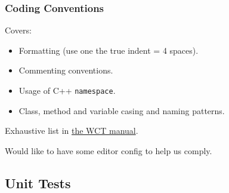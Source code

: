 \documentclass[xcolor=dvipsnames]{beamer}
\begin{document}
\begin{frame}
  \tableofcontents[
  currentsection,
  currentsubsection,        
  subsectionstyle=show/shaded/hide]
\end{frame}

\begin{frame}
  \frametitle{Coding Conventions}
  Covers:
  \begin{itemize}
  \item Formatting (use one the true indent = 4 spaces).
  \item Commenting conventions.
  \item Usage of C++ \texttt{namespace}.
  \item Class, method and variable casing and naming patterns.
  \end{itemize}
  Exhaustive list in \href{https://wirecell.github.io/}{the WCT manual}.

  \vfill
  Would like to have some editor config to help us comply.
\end{frame}

\subsection{Unit Tests}

\begin{frame}
  \tableofcontents[
  currentsection,
  currentsubsection,        
  subsectionstyle=show/shaded/hide]
\end{frame}
\end{document}
